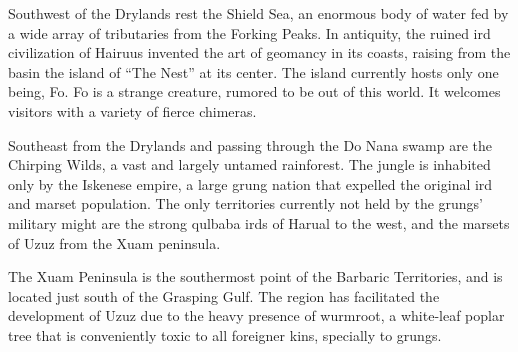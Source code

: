 Southwest of the Drylands rest the Shield Sea, an enormous body of water fed by a wide array of tributaries from the Forking Peaks.
In antiquity, the ruined ird civilization of Hairuus invented the art of geomancy in its coasts, raising from the basin the island of ``The Nest'' at its center.
The island currently hosts only one being, Fo.
Fo is a strange creature, rumored to be out of this world.
It welcomes visitors with a variety of fierce chimeras.

Southeast from the Drylands and passing through the Do Nana swamp are the Chirping Wilds, a vast and largely untamed rainforest.
The jungle is inhabited only by the Iskenese empire, a large grung nation that expelled the original ird and marset population.
The only territories currently not held by the grungs' military might are the strong qulbaba irds of Harual to the west, and the marsets of Uzuz from the Xuam peninsula.

The Xuam Peninsula is the southermost point of the Barbaric Territories, and is located just south of the Grasping Gulf.
The region has facilitated the development of Uzuz due to the heavy presence of wurmroot, a white-leaf poplar tree that is conveniently toxic to all foreigner kins, specially to grungs.
